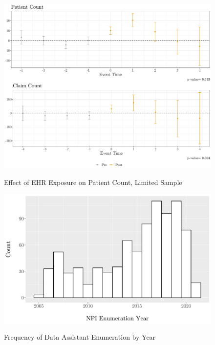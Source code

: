 \documentclass[11pt]{article}
\begin{document}
\begin{figure}[p]
    \centering
    \caption{Effect of EHR Exposure on Patient Count, Limited Sample}
    \includegraphics[scale=.45]{Objects/limitedsample_plot.pdf}
    \label{fig:limitedsample}
\end{figure}

\begin{figure}[p]
\centering
\caption{Frequency of Data Assistant Enumeration by Year}
\includegraphics[scale=.5]{Objects/dataassistant_histogram.pdf}
\label{fig:dataassistant_histogram}
\end{figure}

\clearpage

\renewcommand*{\bibfont}{\footnotesize}

\printbibliography
\end{document}

